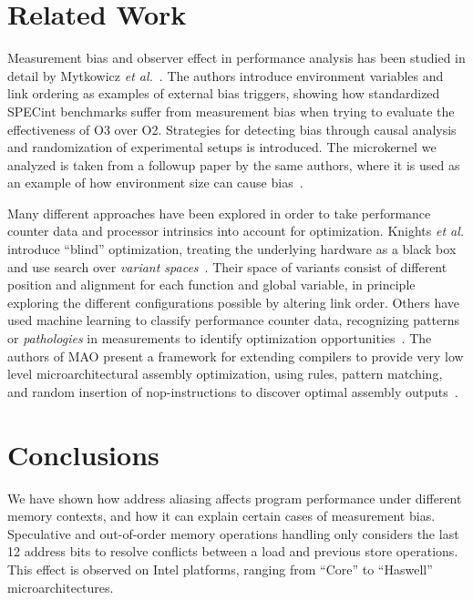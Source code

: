 \documentclass[10pt, conference, compsocconf]{IEEEtran}
\begin{document}
\section{Related Work}
\label{sec:related}
Measurement bias and observer effect in performance analysis has been studied in detail by Mytkowicz \emph{et al.}~\cite{Mytkowicz:2008:OE&MB,Mytkowicz:2008:Easy}.
The authors introduce environment variables and link ordering as examples of external bias triggers, showing how standardized {\small SPECint} benchmarks suffer from measurement bias when trying to evaluate the effectiveness of O3 over O2. 
Strategies for detecting bias through causal analysis and randomization of experimental setups is introduced.
The microkernel we analyzed is taken from a followup paper by the same authors, where it is used as an example of how environment size can cause bias~\cite{Mytkowicz:2009:WrongData}.

Many different approaches have been explored in order to take performance counter data and processor intrinsics into account for optimization.
Knights \emph{et al.} introduce ``blind'' optimization, treating the underlying hardware as a black box and use search over \emph{variant spaces}~\cite{Knights:2009:BlindOpt}.
Their space of variants consist of different position and alignment for each function and global variable, in principle exploring the different configurations possible by altering link order.
Others have used machine learning to classify performance counter data, recognizing patterns or \emph{pathologies} in measurements to identify optimization opportunities~\cite{Yoo:ADD}.
The authors of MAO present a framework for extending compilers to provide very low level microarchitectural assembly optimization, using rules, pattern matching, and random insertion of nop-instructions to discover optimal assembly outputs~\cite{Hundt:2011:MAO}.

\section{Conclusions}
\label{sec:conclusions}
We have shown how address aliasing affects program performance under different memory contexts, and how it can explain certain cases of measurement bias.
Speculative and out-of-order memory operations handling only considers the last 12 address bits to resolve conflicts between a load and previous store operations.
This effect is observed on Intel platforms, ranging from ``Core'' to ``Haswell'' microarchitectures.
\end{document}
